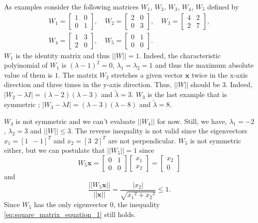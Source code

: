 \documentclass[12pt]{report}
\numberwithin{figure}{chapter}
\theoremstyle{plain}
\theoremstyle{definition}
\theoremstyle{corollary}
\theoremstyle{definition}
\theoremstyle{plain}
\theoremstyle{definition}
\theoremstyle{plain}
\newcommand\bx{\ensuremath{\boldsymbol x}}
\begin{document}
As examples consider the following matrices \(W_1\), \(W_2\), \(W_3\), \(W_4\), \(W_5\) defined by
\begin{gather*}
W_1=\begin{bmatrix}
1&0\\0&1
\end{bmatrix},\quad
W_2=\begin{bmatrix}
2&0\\0&3
\end{bmatrix},\quad
W_3=\begin{bmatrix}
4&2\\2&7
\end{bmatrix},\\
W_4=\begin{bmatrix}
1&3\\2&0
\end{bmatrix},\quad
W_5=\begin{bmatrix}
0&1\\0&0
\end{bmatrix}.\quad
\end{gather*}
\(W_1\) is the identity matrix and thus \(||W||=1\).
Indeed, the characteristic polyinomial of \(W_1\) is \((\lambda-1)^2=0\), \(\lambda_1=\lambda_2=1\) and thus the maximum absolute value of them is \(1\).
The matrix \(W_2\) stretches a given vector \(\bx\) twice in the x-axis direction and three times in the y-axis direction.
Thus, \(||W||\) should be \(3\).
Indeed, \(|W_2-\lambda I|=(\lambda-2)(\lambda-3)\) and \(\tilde\lambda=3\).
\(W_3\) is the last example that is symmetric ; \(|W_3-\lambda I|=(\lambda-3)(\lambda-8)\) and \(\tilde\lambda=8\).

\(W_4\) is not symmetric and we can't evaluate \(||W_4||\) for now.
Still, we have, \(\lambda_1=-2\), \(\lambda_2=3\) and \(||W||\le3\).
The reverse inequality is not valid since the eigenvectors \(x_1=[1\:\:-1]^T\) and \(x_2=[3\:\:2]^T\) are not perpendicular.
\(W_5\) is not symmetric either, but we can postulate that \(||W_5||=1\) since
\[
W_5\bx=
\begin{bmatrix}
0&1\\0&0
\end{bmatrix}
\begin{bmatrix}
x_1\\x_2
\end{bmatrix}
=
\begin{bmatrix}
x_2\\0
\end{bmatrix}
\]
and
\[
\frac{||W_5\bx||}{||\bx||}=\frac{|x_2|}{\sqrt{{x_1}^2+{x_2}^2}}\le 1.
\]
Since \(W_5\) has the only eigenvector \(0\), the inequality \eqref{eq:square_matrix_equation_1} still holds.
\end{document}
